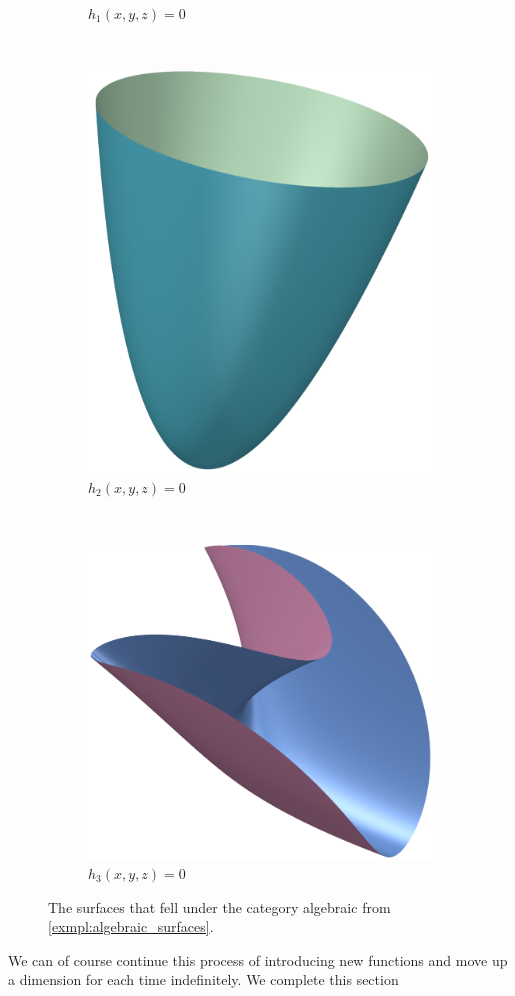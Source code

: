 \documentclass{article}
\begin{document}
\begin{example}
\begin{figure}[]
\begin{subfigure}[t]{0.3\textwidth}
                \caption{$h_1(x, y, z) = 0$}
            \end{subfigure}
            ~
            \begin{subfigure}[t]{0.3\textwidth}
                \includegraphics[height=0.6\textwidth]{pictures/example_two.png} 
                \caption{$h_2(x, y, z) = 0$}
            \end{subfigure}
            ~
            \begin{subfigure}[t]{0.3\textwidth}
                \includegraphics[height=0.6\textwidth]{pictures/example_three.png} 
                \caption{$h_3(x, y, z) = 0$}
            \end{subfigure}
            \caption{The surfaces that fell under the category algebraic from
            \cref{exmpl:algebraic_surfaces}.}
            \label{fig:algebraic_surfaces}
        \end{figure}
    \end{example}
    We can of course continue this process of introducing new functions and
    move up a dimension for each time indefinitely.  We complete this section
\end{document}
